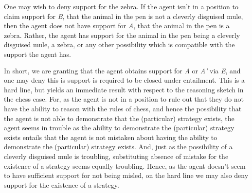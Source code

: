\documentclass[10pt]{article}
\begin{document}
\begin{note}
  One may wish to deny support for the zebra.
  If the agent isn't in a position to claim support for \emph{B}, that the animal in the pen is not a cleverly disguised mule, then the agent does not have support for \emph{A}, that the animal in the pen is a zebra.
  Rather, the agent has support for the animal in the pen being a cleverly disguised mule, a zebra, or any other possibility which is compatible with the support the agent has.

  In short, we are granting that the agent obtains support for \emph{A} or \emph{A'} via \emph{E}, and one may deny this is support is required to be closed under entailment.
  This is a hard line, but yields an immediate result with respect to the reasoning sketch in the chess case.
  For, as the agent is not in a position to rule out that they do not have the ability to reason with the rules of chess, and hence the possibility that the agent is not able to demonstrate that the (particular) strategy exists, the agent seems in trouble as the ability to demonstrate the (particular) strategy exists entails that the agent is not mistaken about having the ability to demonstrate the (particular) strategy exists.
  And, just as the possibility of a cleverly disguised mule is troubling, substituting absence of mistake for the existence of a strategy seems equally troubling.
  Hence, as the agent doesn't seem to have sufficient support for not being misled, on the hard line we may also deny support for the existence of a strategy.
\end{note}
\end{document}
